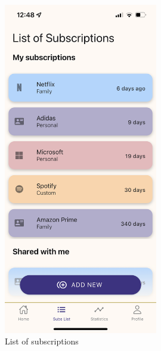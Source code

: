 \documentclass[11pt]{article}
\begin{document}
\begin{figure}[h!]
\begin{minipage}[c]{0.45\textwidth}
        \includegraphics[width=0.6\textwidth, clip]{../../assets/smartphone/subsList.PNG}
        \caption{List of subscriptions}
        \label{fig:subsList}
    \end{minipage}
\end{figure}
\end{document}
